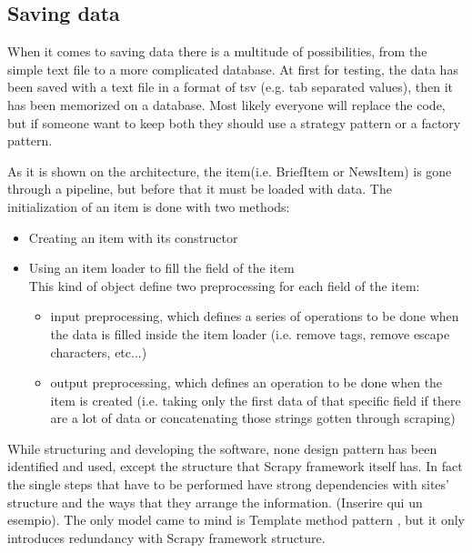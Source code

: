 \subsection{Saving data}
When it comes to saving data there is a multitude of possibilities, from the simple text file to a more complicated database. 
At first for testing, the data has been saved with a text file in a format of tsv (e.g. tab separated values), then it has been memorized on a database. 
Most likely everyone will replace the code, but if someone want to keep both they should use a strategy pattern or a factory pattern.
\par
As it is shown on the architecture, the item(i.e. BriefItem or NewsItem) is gone through a pipeline, but before that it must be loaded with data.
The initialization of an item is done with two methods:
\begin{itemize}
	\item Creating an item with its constructor
	\item Using an item loader to fill the field of the item\\
	This kind of object define two preprocessing for each field of the item:
	\begin{itemize}
		\item input preprocessing, which defines a series of operations to be done when the data is filled inside the item loader (i.e. remove tags, remove escape characters, etc...)
		\item output preprocessing, which defines an operation to be done when the item is created (i.e. taking only the first data of that specific field if there are a lot of data or concatenating those strings gotten through scraping)
	\end{itemize}
\end{itemize}
\par While structuring and developing the software, none design pattern has been identified and used, except the structure that Scrapy framework itself has. In fact the single steps that have to be performed have strong dependencies with sites' structure and the ways that they arrange the information. (Inserire qui un esempio). The only model came to mind is Template method pattern \cite{templatepattern}, but it only introduces redundancy with Scrapy framework structure. 



